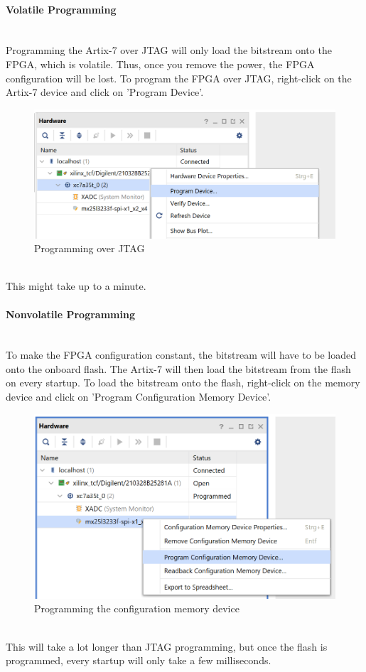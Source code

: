 \paragraph{Volatile Programming}~\\
Programming the Artix-7 over JTAG will only load the bitstream onto the FPGA, which is volatile. Thus, once you remove the power, the FPGA configuration will be lost.
To program the FPGA over JTAG, right-click on the Artix-7 device and click on 'Program Device'.
\begin{figure}[h]
    \center
    \includegraphics[scale=0.8]{assets/jtag-programming.png}
    \caption{Programming over JTAG}
\end{figure}\\
This might take up to a minute.

\paragraph{Nonvolatile Programming}~\\
To make the FPGA configuration constant, the bitstream will have to be loaded onto the onboard flash. The Artix-7 will then load the bitstream from the flash on every startup.
To load the bitstream onto the flash, right-click on the memory device and click on 'Program Configuration Memory Device'.
\begin{figure}[h]
    \center
    \includegraphics[scale=0.8]{assets/spi programming.png}
    \caption{Programming the configuration memory device}
\end{figure}~\\
This will take a lot longer than JTAG programming, but once the flash is programmed, every startup will only take a few milliseconds.
